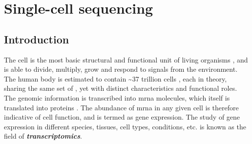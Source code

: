 
\section{Single-cell  sequencing}  %
\label{sec:int_scrna}




\subsection{Introduction}
\label{sec:int_scrna_intro}


\par The cell is the most basic structural and functional unit of living organisms \textbf{\cite{regev_human_nodate}}, and is able to divide, multiply, grow and respond to signals from the environment. The human body is estimated to contain \textasciitilde37 trillion cells \textbf{\cite{wen_recent_2022}}, each in theory, sharing the same set of , yet with distinct characteristics and functional roles. The genomic information is transcribed into \gls{mrna} molecules, which itself is translated into proteins \textbf{\cite{costa_uncovering_2010}}. The abundance of \gls{mrna} in any given cell is therefore indicative of cell function, and is termed as gene expression. The study of gene expression in different species, tissues, cell types, conditions, etc. is known as the field of \textit{\textbf{transcriptomics}}.\\

